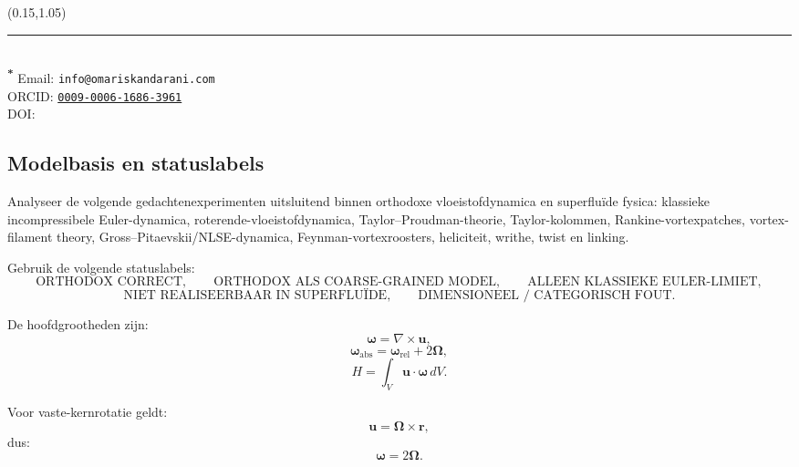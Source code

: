 \documentclass[11pt]{article}
\begin{document}
    \begin{textblock*}{1\textwidth}(0.15\textwidth,1.05\textheight)\raggedright\footnotesize\renewcommand{\arraystretch}{1.0} \noindent\rule{\textwidth}{0.4pt}\\[0.5em]
        \textsuperscript{\textbf{*}} Email: \texttt{info@omariskandarani.com}\\  
        ORCID: \texttt{\href{https://orcid.org/0009-0006-1686-3961}{0009-0006-1686-3961}}\\
        DOI: \href{https://doi.org/\paperdoi}{\paperdoi}    
    \end{textblock*}
    
    
    
    \newpage
    
    
    
    \subsection{Modelbasis en statuslabels}
        
        Analyseer de volgende gedachtenexperimenten uitsluitend binnen orthodoxe vloeistofdynamica en superfluïde fysica:
        klassieke incompressibele Euler-dynamica, roterende-vloeistofdynamica, Taylor--Proudman-theorie,
        Taylor-kolommen, Rankine-vortexpatches, vortex-filament theory, Gross--Pitaevskii/NLSE-dynamica,
        Feynman-vortexroosters, heliciteit, writhe, twist en linking.
        
        Gebruik de volgende statuslabels:
        \[
            \text{ORTHODOX CORRECT},
            \qquad
            \text{ORTHODOX ALS COARSE-GRAINED MODEL},
            \qquad
            \text{ALLEEN KLASSIEKE EULER-LIMIET},
        \]
        \[
            \text{NIET REALISEERBAAR IN SUPERFLUÏDE},
            \qquad
            \text{DIMENSIONEEL / CATEGORISCH FOUT}.
        \]
        
        De hoofdgrootheden zijn:
        \[
            \boldsymbol{\omega}=\nabla\times\mathbf{u},
        \]
        \[
            \boldsymbol{\omega}_{\mathrm{abs}}
            =
            \boldsymbol{\omega}_{\mathrm{rel}}
            +
            2\boldsymbol{\Omega},
        \]
        \[
            H=\int_V \mathbf{u}\cdot\boldsymbol{\omega}\,dV.
        \]
        
        Voor vaste-kernrotatie geldt:
        \[
            \mathbf{u}
            =
            \boldsymbol{\Omega}\times\mathbf{r},
        \]
        dus:
        \[
            \boldsymbol{\omega}
            =
            2\boldsymbol{\Omega}.
        \]
        
\end{document}
